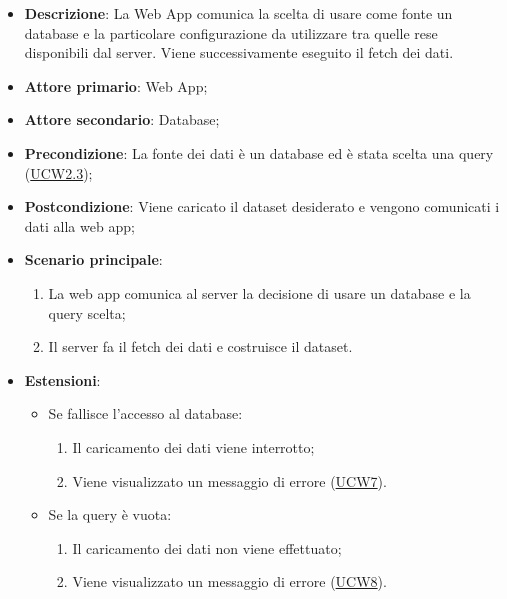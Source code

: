 \begin{itemize}

	\item \textbf{Descrizione}: La Web App comunica la scelta di usare come fonte un database e la particolare configurazione da utilizzare tra quelle
	      rese disponibili dal server. Viene successivamente eseguito il fetch dei dati.

	\item \textbf{Attore primario}: Web App;
	\item \textbf{Attore secondario}: Database;

	\item \textbf{Precondizione}:   La fonte dei dati è un database ed è stata scelta una query (\hyperref[ssub:ucw2.3]{UCW2.3});

	\item \textbf{Postcondizione}:  Viene caricato il dataset desiderato e vengono comunicati i dati alla web app;

	\item \textbf{Scenario principale}:
	      \begin{enumerate}
		      \item La web app comunica al server la decisione di usare un database e la query scelta;
		      \item Il server fa il fetch dei dati e costruisce il dataset.
	      \end{enumerate}

	\item \textbf{Estensioni}:
	      \begin{itemize}

		      \item Se fallisce l'accesso al database:
		            \begin{enumerate}

			            \item Il caricamento dei dati viene interrotto;
			            \item Viene visualizzato un messaggio di errore (\hyperref[sub:ucw7]{UCW7}).

		            \end{enumerate}

		      \item Se la query è vuota:
		            \begin{enumerate}

			            \item Il caricamento dei dati non viene effettuato;
			            \item Viene visualizzato un messaggio di errore (\hyperref[sub:ucw8]{UCW8}).

		            \end{enumerate}

	      \end{itemize}

\end{itemize}